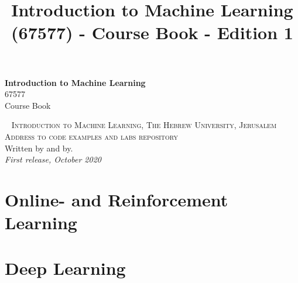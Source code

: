 \documentclass[11pt,fleqn]{book} %
\begin{document}
\title{Introduction to Machine Learning (67577) - Course Book - Edition 1}


\begingroup
\thispagestyle{empty}
\centering
\vspace*{5cm}
\par\normalfont\fontsize{35}{35}\sffamily\selectfont
\textbf{Introduction to Machine Learning}\\
{\LARGE 67577\\Course Book}\par %
\vspace*{1cm}
\endgroup


\newpage
~\vfill
\thispagestyle{empty}
\noindent \textsc{Introduction to Machine Learning, The Hebrew University, Jerusalem}\\

\noindent \textsc{Address to code examples and labs repository}\\ %

\noindent Written by and by.\\ %

\noindent \textit{First release, October 2020} %


\pagestyle{empty} %
\tableofcontents %
\cleardoublepage %
\pagestyle{fancy} %







    




\chapter{Online- and Reinforcement Learning}
\chapter{Deep Learning}

\newpage
\end{document}
